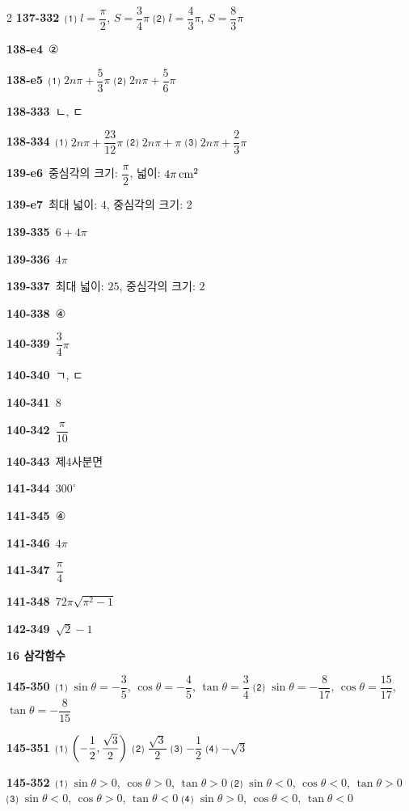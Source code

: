 \documentclass[10pt,a4paper]{article}
\begin{document}
\begin{multicols}{2}
\noindent\textbf{137-332}\ ⑴ $l=\dfrac{\pi}{2}$, $S=\dfrac{3}{4}\pi$ ⑵ $l=\dfrac{4}{3}\pi$, $S=\dfrac{8}{3}\pi$\par
\noindent\textbf{138-e4}\ ②\par
\noindent\textbf{138-e5}\ ⑴ $2n\pi+\dfrac{5}{3}\pi$ ⑵ $2n\pi+\dfrac{5}{6}\pi$\par
\noindent\textbf{138-333}\ ㄴ, ㄷ\par
\noindent\textbf{138-334}\ ⑴ $2n\pi+\dfrac{23}{12}\pi$ ⑵ $2n\pi+\pi$ ⑶ $2n\pi+\dfrac{2}{3}\pi$\par
\noindent\textbf{139-e6}\ 중심각의 크기: $\dfrac{\pi}{2}$, 넓이: $4\pi\mkern3mu \mathrm{cm}^2$\par
\noindent\textbf{139-e7}\ 최대 넓이: $4$, 중심각의 크기: $2$\par
\noindent\textbf{139-335}\ $6+4\pi$\par
\noindent\textbf{139-336}\ $4\pi$\par
\noindent\textbf{139-337}\ 최대 넓이: $25$, 중심각의 크기: $2$\par
\noindent\textbf{140-338}\ ④\par
\noindent\textbf{140-339}\ $\dfrac{3}{4}\pi$\par
\noindent\textbf{140-340}\ ㄱ, ㄷ\par
\noindent\textbf{140-341}\ $8$\par
\noindent\textbf{140-342}\ $\dfrac{\pi}{10}$\par
\noindent\textbf{140-343}\ 제$4$사분면\par
\noindent\textbf{141-344}\ $300^\circ$\par
\noindent\textbf{141-345}\ ④\par
\noindent\textbf{141-346}\ $4\pi$\par
\noindent\textbf{141-347}\ $\dfrac{\pi}{4}$\par
\noindent\textbf{141-348}\ $72\pi\sqrt{\pi^2-1}$\par
\noindent\textbf{142-349}\ $\sqrt{2}-1$\par
\noindent\textbf{16 삼각함수}\par\smallskip
\noindent\textbf{145-350}\ ⑴ $\sin\theta=-\dfrac{3}{5}$, $\cos\theta=-\dfrac{4}{5}$, $\tan\theta=\dfrac{3}{4}$ ⑵ $\sin\theta=-\dfrac{8}{17}$, $\cos\theta=\dfrac{15}{17}$, $\tan\theta=-\dfrac{8}{15}$\par
\noindent\textbf{145-351}\ ⑴ $\left(-\dfrac{1}{2}{,}\mkern3mu\mathopen{}\dfrac{\sqrt{3}}{2}\right)$ ⑵ $\dfrac{\sqrt{3}}{2}$ ⑶ $-\dfrac{1}{2}$ ⑷ $-\sqrt{3}$\par
\noindent\textbf{145-352}\ ⑴ $\sin\theta>0$, $\cos\theta>0$, $\tan\theta>0$ ⑵ $\sin\theta<0$, $\cos\theta<0$, $\tan\theta>0$ ⑶ $\sin\theta<0$, $\cos\theta>0$, $\tan\theta<0$ ⑷ $\sin\theta>0$, $\cos\theta<0$, $\tan\theta<0$\par

\end{multicols}
\end{document}
